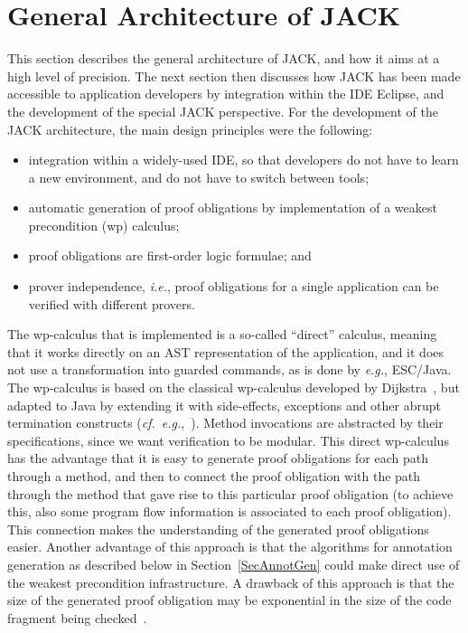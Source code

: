 
\section{General Architecture of JACK}\label{SecArchitecture}

This section describes the general architecture of JACK, and how it
aims at a high level of precision.  The next section then discusses
how JACK has been made accessible to application developers by
integration within the IDE Eclipse, and the development of the special
JACK perspective. For the development of the JACK architecture, the
main design principles were the following:
\begin{itemize}
\item integration within a widely-used IDE, so that developers do not
have to learn a new environment, and do not have to switch between tools;
\item automatic generation of proof obligations by
implementation of a weakest precondition (wp) calculus;
\item proof obligations are first-order logic formulae; and
\item prover independence, \emph{i.e.}, proof obligations for
a single application can be verified with different provers.
\end{itemize}

The wp-calculus that is implemented is a so-called ``direct''
calculus, meaning that it works directly on an AST representation of
the application, and it does not use a transformation into guarded
commands, as is done by \emph{e.g.},  ESC/Java.  The wp-calculus is
based on the classical wp-calculus developed by
Dijkstra~\cite{Dijkstra75}, but adapted to Java by extending it with
side-effects, exceptions and other abrupt termination constructs
(\emph{cf.}\
\emph{e.g.},~\cite{Jacobs04}).
Method invocations are abstracted by their specifications, since we
want verification to be modular.  This direct wp-calculus has the
advantage that it is easy to generate proof obligations for each path
through a method, and then to connect the proof obligation with the
path through the method that gave rise to this particular proof
obligation (to achieve this, also some program flow information is
associated to each proof obligation). This connection makes the
understanding of the generated proof obligations easier. Another
advantage of this approach is that the algorithms for annotation
generation as described below in Section~\ref{SecAnnotGen} could make
direct use of the weakest precondition infrastructure. A drawback of
this approach is that the size of the generated proof obligation may
be exponential in the size of the code fragment being
checked~\cite{FlanaganS01}.


